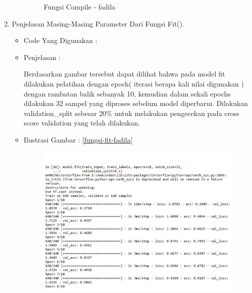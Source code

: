 \begin{enumerate}
\begin{itemize}
\begin{figure}[!hbtp]
\caption{Fungsi Compile - fadila}
\label{fungsi-compile-fadila}
\end{figure}
\par
\end{itemize}
\par
\par
\par
\par
\par
\par
\item Penjelasan Masing-Masing Parameter Dari Fungsi Fit().
\begin{itemize}
\item Code Yang Digunakan :
\par

\par
\item Penjelasan :
\par Berdasarkan gambar tersebut dapat dilihat bahwa pada model fit dilakukan pelatihan dengan epoch(  iterasi berapa kali nilai digunakan ) dengan rambatan balik sebanyak 10, kemudian dalam sekali epochs dilakukan 32  sampel yang diproses sebelum model diperbarui. Dilakukan validation\_split sebesar 20\% untuk melakukan pengecekan pada cross score validation yang telah dilakukan.
\par
\par
\item Ilustrasi Gambar : \ref{fungsi-fit-fadila}
\par
\begin{figure}[!hbtp]
\centering
\includegraphics[scale=0.2]{figures/fungsi-fit-fadila.jpg}

\end{figure}
\end{itemize}
\end{enumerate}
